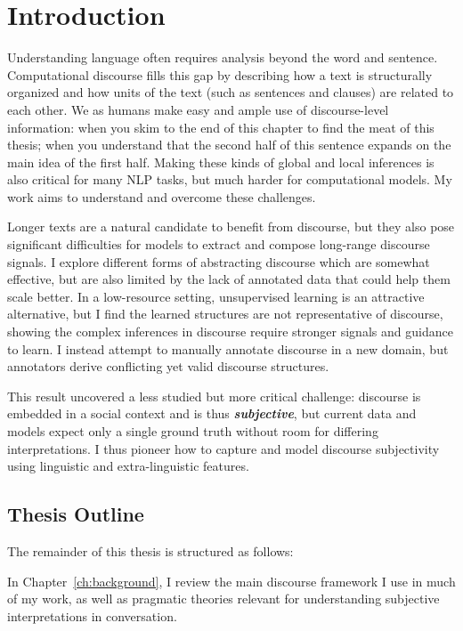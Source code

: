 \chapter{Introduction}
\label{ch:intro}


Understanding language often requires analysis beyond the word and sentence. Computational discourse fills this gap by describing how a text is structurally organized and how units of the text (such as sentences and clauses) are related to each other. We as humans make easy and ample use of discourse-level information: when you skim to the end of this chapter to find the meat of this thesis; when you understand that the second half of this sentence expands on the main idea of the first half. Making these kinds of global and local inferences is also critical for many NLP tasks, but much harder for computational models. My work aims to understand and overcome these challenges.     

Longer texts are a natural candidate to benefit from discourse, but they also pose significant difficulties for models to extract and compose long-range discourse signals. I explore different forms of abstracting discourse which are somewhat effective, but are also limited by the lack of annotated data that could help them scale better. In a low-resource setting, unsupervised learning is an attractive alternative, but I find the learned structures are not representative of discourse, showing the complex inferences in discourse require stronger signals and guidance to learn. I instead attempt to manually annotate discourse in a new domain, but annotators derive conflicting yet valid discourse structures. 

This result uncovered a less studied but more critical challenge: discourse is embedded in a social context and is thus \textbf{\emph{subjective}}, but current data and models expect only a single ground truth without room for differing interpretations. I thus pioneer how to capture and model discourse subjectivity using linguistic and extra-linguistic features. 

\section{Thesis Outline}

The remainder of this thesis is structured as follows:

In Chapter~\ref{ch:background}, I review the main discourse framework I use in much of my work, as well as pragmatic theories relevant for understanding subjective interpretations in conversation.

